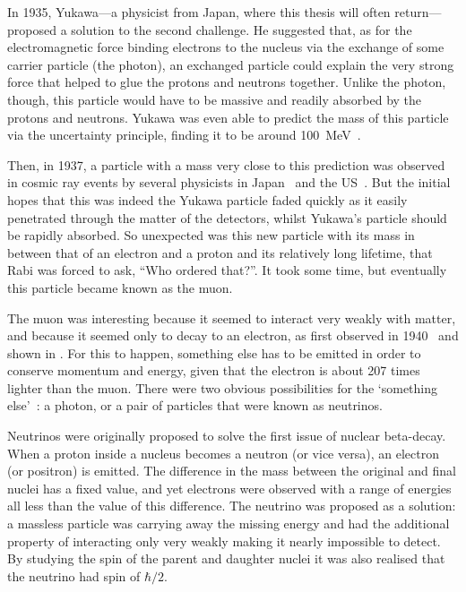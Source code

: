 In 1935, Yukawa---a physicist from Japan, where this thesis will often return---proposed a solution to the second challenge.
He suggested that, as for the electromagnetic force binding electrons to the nucleus via the exchange of some carrier particle (the photon), 
an exchanged particle could explain the very strong force that helped to glue the protons and neutrons together.
Unlike the photon, though, this particle would have to be massive and readily absorbed by the protons and neutrons.
Yukawa was even able to predict the mass of this particle via the uncertainty principle, finding it to be around 100~MeV~\cite{Yukawa:1935xg}.

\FigTheoryMuonDecayCloudChamber
Then, in 1937, a particle with a mass very close to this prediction was observed in cosmic ray events by several physicists in Japan~\cite{Nishina193712} and the US~\cite{Neddermeyer1937md,Street193711}.
But the initial hopes that this was indeed the Yukawa particle faded quickly as it easily penetrated through the matter of the detectors, whilst Yukawa's particle should be rapidly absorbed.
So unexpected was this new particle with its mass in between that of an electron and a proton and its relatively long lifetime, that Rabi was forced to ask, ``Who ordered that?''.
It took some time, but eventually this particle became known as the muon.

The muon was interesting because it seemed to interact very weakly with matter, and because it seemed only to decay to an electron, as first observed in 1940~\cite{Williams1940102} and shown in .
For this to happen, something else has to be emitted in order to conserve momentum and energy, given that the electron is about 207 times lighter than the muon.
There were two obvious possibilities for the `something else'~\cite{Pontecorvo:1947vp}: a photon, or a pair of particles that were known as neutrinos.

Neutrinos were originally proposed to solve the first issue of nuclear beta-decay.
When a proton inside a nucleus becomes a neutron (or vice versa), an electron (or positron) is emitted.
The difference in the mass between the original and final nuclei has a fixed value, and yet electrons were observed with a range of energies all less than the value of this difference.
The neutrino was proposed as a solution: a massless particle was carrying away the missing energy and had the additional property of interacting only very weakly making it nearly impossible to detect.
By studying the spin of the parent and daughter nuclei it was also realised that the neutrino had spin of $\hbar/2$.

